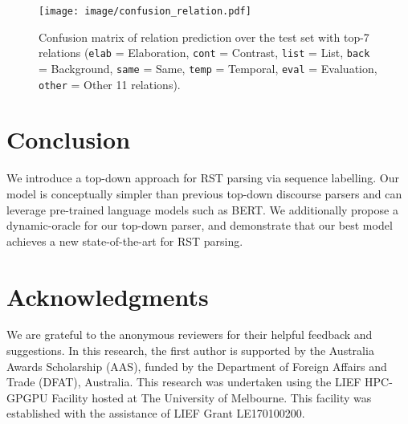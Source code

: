 \documentclass[11pt,a4paper]{article}
\newcommand{\rstrel}[1]{\texttt{#1}\xspace}
\begin{document}
\begin{figure}[t]
	\centering
	\texttt{[image: image/confusion\_relation.pdf]}
	\caption{Confusion matrix of relation prediction over the test set with top-7 relations (\rstrel{elab} = Elaboration, \rstrel{cont} = Contrast, \rstrel{list} = List, \rstrel{back} = Background, \rstrel{same} = Same, \rstrel{temp} = Temporal, \rstrel{eval} = Evaluation, \rstrel{other} = Other 11 relations).}
	\label{fig:confusion_relation}
\end{figure}
















\section{Conclusion}

We introduce a top-down approach for RST parsing via sequence labelling.
Our model is conceptually simpler than previous top-down discourse parsers and can leverage pre-trained language models such as BERT. We additionally propose a dynamic-oracle for our top-down parser, and demonstrate that our best model achieves a new
state-of-the-art for RST parsing.






\section*{Acknowledgments}

We are grateful to the anonymous reviewers for
their helpful feedback and suggestions. In this research, the first author is
supported by the Australia Awards Scholarship (AAS), funded by the Department of Foreign Affairs and Trade (DFAT), Australia.
This research was undertaken using the LIEF HPC-GPGPU Facility hosted at The University of Melbourne. This facility was established with the assistance of LIEF Grant LE170100200.




\clearpage

\appendix
\end{document}
